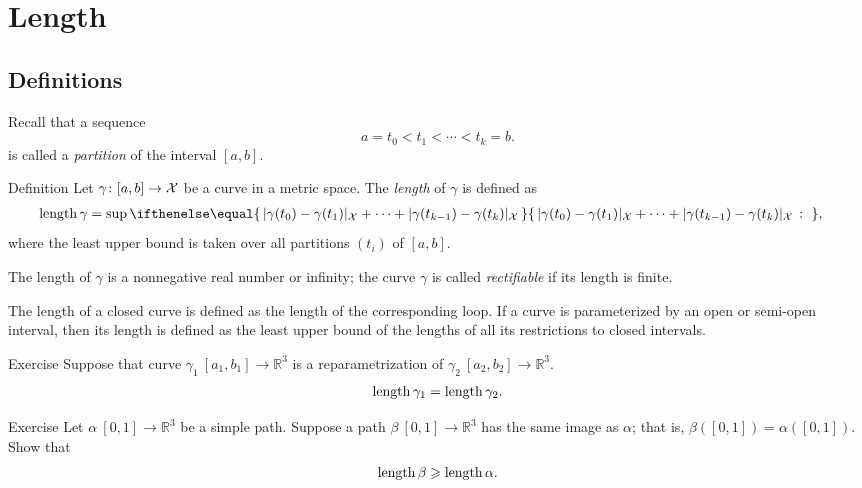 \chapter{Length}
\label{chap:length}

\section{Definitions}

Recall that a sequence 
\[a=t_0 < t_1 < \cdots < t_k=b.\]
is called a \emph{partition} of the interval $[a,b]$.

\begin{thm}{Definition}\label{def:length}
Let $\gamma\colon[a,b]\to \mathcal{X}$ be a curve in a metric space.
The \emph{length} of $\gamma$ is defined as
\begin{align*}
\length \gamma
&= 
\sup
\set{\dist{\gamma(t_0)}{\gamma(t_1)}{\spc{X}}
+\dots+
\dist{\gamma(t_{k-1})}{\gamma(t_k)}{\spc{X}}}{},
\end{align*}
where the least upper bound is taken over all partitions $(t_i)$ of $[a,b]$.

The length of $\gamma$ is a nonnegative real number or infinity;
the curve $\gamma$ is called \emph{rectifiable} if its length is finite. 

The length of a closed curve is defined as the length of the corresponding loop.
If a curve is parameterized by an open or semi-open interval, then its length is defined as the least upper bound of the lengths of all its restrictions to closed intervals.
\end{thm}


\begin{thm}{Exercise}\label{ex:integral-length-0}
Suppose that curve $\gamma_1\:[a_1,b_1] \to\mathbb{R}^3$ is a reparametrization of $\gamma_2\:[a_2,b_2] \to\mathbb{R}^3$. 
\[\mathop{\rm length}\nolimits \gamma_1 = \mathop{\rm length}\nolimits \gamma_2.\]

\end{thm}


\begin{thm}{Exercise}\label{ex:length-image}
Let $\alpha\:[0,1]\to\mathbb{R}^3$ be a simple path.
Suppose a path $\beta\:[0,1]\to\mathbb{R}^3$ has the same image as $\alpha$;
that is, $\beta([0,1])=\alpha([0,1])$.
Show that 
\[\mathop{\rm length}\nolimits \beta\geqslant \mathop{\rm length}\nolimits \alpha.\]

\end{thm}

